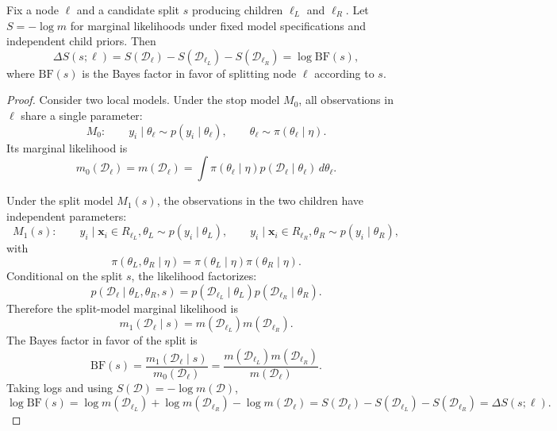 \begin{proposition}
\label{prop:split_bf}
Fix a node $\ell$ and a candidate split $s$ producing children $\ell_L$ and $\ell_R$.
Let $S=-\log m$ for marginal likelihoods under fixed model specifications and independent child priors. Then
\[
\Delta S(s;\ell)
=
S(\mathcal{D}_\ell)
-
S(\mathcal{D}_{\ell_L})
-
S(\mathcal{D}_{\ell_R})
=
\log \mathrm{BF}(s),
\]
where $\mathrm{BF}(s)$ is the Bayes factor \citep{kass1995bayes} in favor of splitting node $\ell$ according to $s$.
\end{proposition}

\begin{proof}
Consider two local models. Under the stop model $M_0$, all observations in $\ell$ share a single parameter:
\[
M_0:\qquad
y_i\mid\theta_\ell \sim p(y_i\mid\theta_\ell),
\qquad
\theta_\ell\sim\pi(\theta_\ell\mid\eta).
\]
Its marginal likelihood is
\[
m_0(\mathcal{D}_\ell)
=
m(\mathcal{D}_\ell)
=
\int
\pi(\theta_\ell\mid\eta)
p(\mathcal{D}_\ell\mid\theta_\ell)
\,d\theta_\ell .
\]

Under the split model $M_1(s)$, the observations in the two children have independent parameters:
\[
M_1(s):\qquad
y_i\mid \mathbf{x}_i\in R_{\ell_L},\theta_L\sim p(y_i\mid\theta_L),
\qquad
y_i\mid \mathbf{x}_i\in R_{\ell_R},\theta_R\sim p(y_i\mid\theta_R),
\]
with
\[
\pi(\theta_L,\theta_R\mid\eta)
=
\pi(\theta_L\mid\eta)\pi(\theta_R\mid\eta).
\]
Conditional on the split $s$, the likelihood factorizes:
\[
p(\mathcal{D}_\ell\mid\theta_L,\theta_R,s)
=
p(\mathcal{D}_{\ell_L}\mid\theta_L)
p(\mathcal{D}_{\ell_R}\mid\theta_R).
\]
Therefore the split-model marginal likelihood is
\[
m_1(\mathcal{D}_\ell\mid s)
=
m(\mathcal{D}_{\ell_L})m(\mathcal{D}_{\ell_R}).
\]
The Bayes factor in favor of the split is
\[
\mathrm{BF}(s)
=
\frac{
m_1(\mathcal{D}_\ell\mid s)
}{
m_0(\mathcal{D}_\ell)
}
=
\frac{
m(\mathcal{D}_{\ell_L})m(\mathcal{D}_{\ell_R})
}{
m(\mathcal{D}_\ell)
}.
\]
Taking logs and using $S(\mathcal{D})=-\log m(\mathcal{D})$,
\[
\log \mathrm{BF}(s)
=
\log m(\mathcal{D}_{\ell_L})
+
\log m(\mathcal{D}_{\ell_R})
-
\log m(\mathcal{D}_\ell)
=
S(\mathcal{D}_\ell)
-
S(\mathcal{D}_{\ell_L})
-
S(\mathcal{D}_{\ell_R})
=
\Delta S(s;\ell).
\]
\end{proof}

